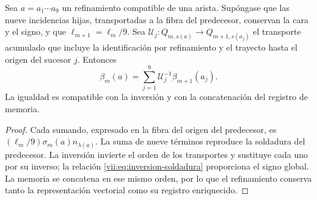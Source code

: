 \begin{proposition}
\label{vii:prop:refinamiento-soldadura}
Sea \(a=a_1\cdots a_9\) un refinamiento compatible de una arista.
Supóngase que las nueve incidencias hijas, transportadas a la fibra del
predecesor, conservan la cara y el signo, y que
\(\ell_{m+1}=\ell_m/9\). Sea
\(\mathcal U_j:Q_{m,s(a)}\longrightarrow Q_{m+1,s(a_j)}\)
el transporte acumulado que incluye la identificación por refinamiento
y el trayecto hasta el origen del sucesor \(j\). Entonces
\[
 \beta_m(a)=
 \sum_{j=1}^{9}\mathcal U_j^{-1}\beta_{m+1}(a_j).
\]
La igualdad es compatible con la inversión y con la concatenación
del registro de memoria.
\end{proposition}

\begin{proof}
Cada sumando, expresado en la fibra del origen del predecesor, es
\((\ell_m/9)\sigma_m(a)n_{\lambda(\underline a)}\).
La suma de nueve términos reproduce la soldadura del predecesor.
La inversión invierte el orden de los transportes y sustituye cada uno
por su inverso; la relación \eqref{vii:eq:inversion-soldadura} proporciona
el signo global. La memoria se concatena en ese mismo orden, por lo
que el refinamiento conserva tanto la representación vectorial como su
registro enriquecido.
\end{proof}
